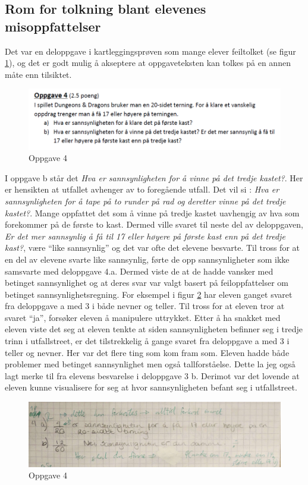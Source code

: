 \documentclass[main.tex]{subfiles}
\begin{document}
\subsection*{Rom for tolkning blant elevenes misoppfattelser}
Det var en deloppgave i kartleggingsprøven som mange elever feiltolket (se figur \ref{fig:oppgave4}), og det er 
godt mulig å akseptere at oppgaveteksten kan tolkes på en annen måte enn tilsiktet.
\begin{figure}[h!]
\centering
\includegraphics[scale = 0.6]{../figures/oppgave4b.png}
\caption{Oppgave 4}
\label{fig:oppgave4}
\end{figure}
I oppgave b står det \emph{Hva er sannsynligheten for å vinne på det tredje kastet?}. Her er hensikten at
utfallet avhenger av to foregående utfall. Det vil si : \emph{Hva er sannsynligheten for å 
tape på to runder på rad og deretter vinne på det tredje kastet?}. Mange oppfattet det som å vinne på tredje kastet 
uavhengig av hva som forekommer på de første to kast. Dermed ville svaret til neste del av deloppgaven, \emph{Er det mer 
sannsynlig å få til 17 eller høyere på første kast enn på det tredje kast?},  være ``like sannsynlig'' og det var ofte 
det elevene besvarte. Til tross for at en del av elevene svarte like sannsynlig, førte de opp sannsynligheter som 
ikke samsvarte med deloppgave 4.a. Dermed viste de at de hadde vansker med betinget sannsynlighet og at deres svar var 
valgt basert på feiloppfattelser om betinget sannsynlighetsregning. For eksempel i figur \ref{fig:maria} har eleven 
ganget svaret fra deloppgave a med 3 i både nevner og teller. Til tross for at eleven tror at svaret ``ja'', forsøker 
eleven å manipulere uttrykket. Etter å ha snakket med eleven viste det seg at eleven 
tenkte at siden sannsynligheten befinner seg i tredje trinn i utfallstreet,  er det tilstrekkelig å gange svaret fra 
deloppgave a med 3 i teller og nevner. Her var det flere ting som kom fram som. Eleven hadde både problemer
med betinget sannsynlighet men også tallforståelse. Dette la jeg også lagt merke til fra elevens besvarelse i deloppgave 
3 b. Derimot var det lovende at eleven kunne visualisere for seg at hvor sannsynligheten befant seg i utfallstreet. 
\begin{figure}[h!]
\centering
\includegraphics[scale = 0.3]{../figures/maria.png}
\caption{Oppgave 4}
\label{fig:maria}
\end{figure}
\end{document}
